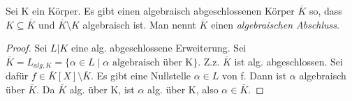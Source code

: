 \documentclass[../main.tex]{subfiles}
\begin{document}
\begin{definition}
    Sei K ein Körper. Es gibt einen algebraisch abgeschlossenen Körper $\overline{K}$ so, dass $K \subseteq \overline{K}$ und $\overline{K}\setminus K$ algebraisch ist. Man nennt $\overline{K}$ einen \emph{algebraischen Abschluss}. 
\end{definition}
\begin{proof}
    Sei $L|K$ eine alg. abgeschlossene Erweiterung. Sei $\overline{K} = L_{alg, K} = \{\alpha \in L \mid \alpha \text{ algebraisch über K}\}$. Z.z. $\overline{K}$ ist alg. abgeschlossen. Sei dafür $f \in \overline{K}[X]\setminus\overline{K}$. Es gibt eine Nullstelle $\alpha \in L$ von f. Dann ist $\alpha$ algebraisch über $\overline{K}$. Da $\overline{K}$ alg. über K, ist $\alpha$ alg. über K, also $\alpha \in \overline{K}$.
\end{proof}
\end{document}
